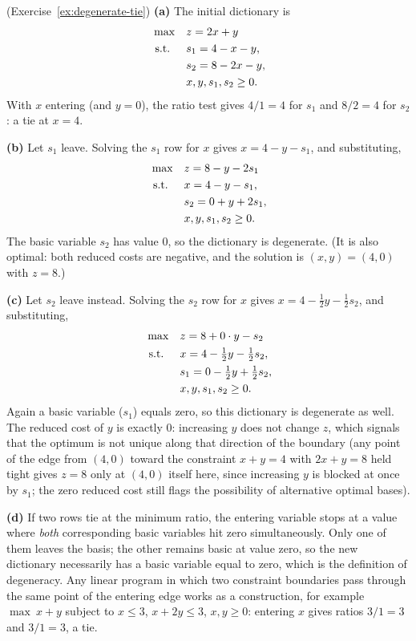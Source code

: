 \begin{solution}(Exercise~\ref{ex:degenerate-tie})
\textbf{(a)} The initial dictionary is
\[
\begin{aligned}
\max\quad & z = 2x + y \\
\text{ s.t. }\quad & s_1 = 4 - x - y, \\
& s_2 = 8 - 2x - y, \\
& x, y, s_1, s_2 \geq 0.
\end{aligned}
\]
With $x$ entering (and $y = 0$), the ratio test gives $4/1 = 4$ for $s_1$ and $8/2 = 4$ for $s_2$: a tie at $x = 4$.

\textbf{(b)} Let $s_1$ leave.  Solving the $s_1$ row for $x$ gives $x = 4 - y - s_1$, and substituting,
\[
\begin{aligned}
\max\quad & z = 8 - y - 2s_1 \\
\text{ s.t. }\quad & x = 4 - y - s_1, \\
& s_2 = 0 + y + 2s_1, \\
& x, y, s_1, s_2 \geq 0.
\end{aligned}
\]
The basic variable $s_2$ has value $0$, so the dictionary is degenerate.  (It is also optimal: both reduced costs are negative, and the solution is $(x, y) = (4, 0)$ with $z = 8$.)

\textbf{(c)} Let $s_2$ leave instead.  Solving the $s_2$ row for $x$ gives $x = 4 - \tfrac12 y - \tfrac12 s_2$, and substituting,
\[
\begin{aligned}
\max\quad & z = 8 + 0 \cdot y - s_2 \\
\text{ s.t. }\quad & x = 4 - \tfrac12 y - \tfrac12 s_2, \\
& s_1 = 0 - \tfrac12 y + \tfrac12 s_2, \\
& x, y, s_1, s_2 \geq 0.
\end{aligned}
\]
Again a basic variable ($s_1$) equals zero, so this dictionary is degenerate as well.  The reduced cost of $y$ is exactly $0$: increasing $y$ does not change $z$, which signals that the optimum is not unique along that direction of the boundary (any point of the edge from $(4,0)$ toward the constraint $x + y = 4$ with $2x + y = 8$ held tight gives $z = 8$ only at $(4,0)$ itself here, since increasing $y$ is blocked at once by $s_1$; the zero reduced cost still flags the possibility of alternative optimal bases).

\textbf{(d)} If two rows tie at the minimum ratio, the entering variable stops at a value where \emph{both} corresponding basic variables hit zero simultaneously.  Only one of them leaves the basis; the other remains basic at value zero, so the new dictionary necessarily has a basic variable equal to zero, which is the definition of degeneracy.  Any linear program in which two constraint boundaries pass through the same point of the entering edge works as a construction, for example $\max\ x + y$ subject to $x \leq 3$, $x + 2y \leq 3$, $x, y \geq 0$: entering $x$ gives ratios $3/1 = 3$ and $3/1 = 3$, a tie.
\end{solution}

